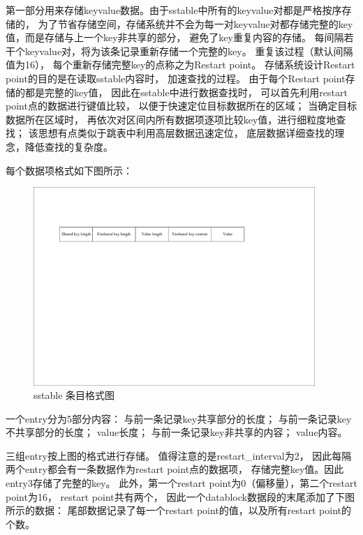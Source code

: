 \begin{enumerate}
\begin{enumerate}
					第一部分用来存储keyvalue数据。由于sstable中所有的keyvalue对都是严格按序存储的，
					为了节省存储空间，存储系统并不会为每一对keyvalue对都存储完整的key值，而是存储与上一个key非共享的部分，
					避免了key重复内容的存储。
					每间隔若干个keyvalue对，将为该条记录重新存储一个完整的key。
					重复该过程（默认间隔值为16），
					每个重新存储完整key的点称之为Restart point。
					存储系统设计Restart point的目的是在读取sstable内容时，
					加速查找的过程。
					由于每个Restart point存储的都是完整的key值，
					因此在sstable中进行数据查找时，
					可以首先利用restart point点的数据进行键值比较，
					以便于快速定位目标数据所在的区域；
					当确定目标数据所在区域时，
					再依次对区间内所有数据项逐项比较key值，进行细粒度地查找；
					该思想有点类似于跳表中利用高层数据迅速定位，
					底层数据详细查找的理念，降低查找的复杂度。
	
					
					每个数据项格式如下图所示：
	
					\begin{figure}[H]
						\centering
						\includegraphics[width=0.95\textwidth]{pdf/entry_format.pdf}
						\caption{sstable 条目格式图}
						\label{sstable_entry_format}
					\end{figure}
	
					一个entry分为5部分内容：
	与前一条记录key共享部分的长度；
	与前一条记录key不共享部分的长度；
	value长度；
	与前一条记录key非共享的内容；
	value内容。

	三组entry按上图的格式进行存储。
	值得注意的是restart\_interval为2，
	因此每隔两个entry都会有一条数据作为restart point点的数据项，
	存储完整key值。因此entry3存储了完整的key。
	此外，第一个restart point为0（偏移量），第二个restart point为16，
	restart point共有两个，
	因此一个datablock数据段的末尾添加了下图所示的数据：
	尾部数据记录了每一个restart point的值，以及所有restart point的个数。
	

\end{enumerate}
\end{enumerate}
